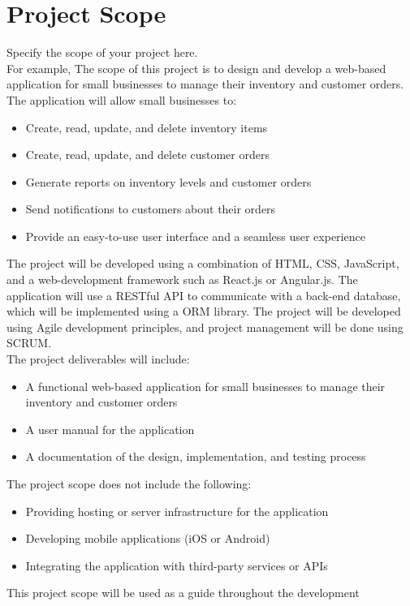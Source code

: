 \section{Project Scope}
Specify the scope of your project here.\\
For example, The scope of this project is to design and develop a web-based application for small businesses to manage their inventory and customer orders. The application will allow small businesses to:
\begin{itemize}
    \item Create, read, update, and delete inventory items
   \item Create, read, update, and delete customer orders
   \item Generate reports on inventory levels and customer orders
   \item Send notifications to customers about their orders
   \item Provide an easy-to-use user interface and a seamless user experience
\end{itemize}
The project will be developed using a combination of HTML, CSS, JavaScript, and a web-development framework such as React.js or Angular.js. The application will use a RESTful API to communicate with a back-end database, which will be implemented using a ORM library. The project will be developed using Agile development principles, and project management will be done using SCRUM.\\
The project deliverables will include:
\begin{itemize}
 \item A functional web-based application for small businesses to manage their inventory and customer orders
 \item A user manual for the application
 \item A documentation of the design, implementation, and testing process
 \end{itemize}
The project scope does not include the following:
\begin{itemize}
 \item  Providing hosting or server infrastructure for the application
 \item Developing mobile applications (iOS or Android)
 \item  Integrating the application with third-party services or APIs
 \end{itemize}
This project scope will be used as a guide throughout the development
